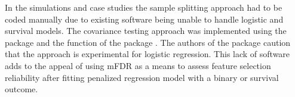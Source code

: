 In the simulations and case studies the sample splitting approach had to be coded manually due to existing software being unable to handle logistic and survival models.  The covariance testing approach was implemented using the  package \citep{CovTest} and the  function of the  package \citep{Selective_Inference}.  The authors of the package caution that the approach is experimental for logistic regression.  This lack of software adds to the appeal of using mFDR as a means to assess feature selection reliability after fitting penalized regression model with a binary or survival outcome.
